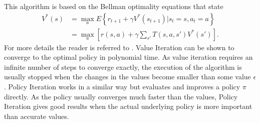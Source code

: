 \documentclass[../main.tex]{subfiles}
\begin{document}
This algorithm is based on the Bellman optimality equations that state
\begin{align}
	V^*(s) &= \max_a E\left\{r_{t+1}+\gamma V^*(s_{t+1}) | s_t = s, a_t = a\right\}\\
	&= \max_a \left[ r(s,a) + \gamma  \sum_{s'} T(s,a,s')V^*(s') \right].
\end{align}
For more details the reader is referred to \cite{sutton1998reinforcement}.
Value Iteration can be shown to converge to the optimal policy in polynomial time. As value iteration requires an infinite number of steps to converge exactly, the execution of the algorithm is usually stopped when the changes in the values become smaller than some value $\epsilon$.
Policy Iteration works in a similar way but evaluates and improves a policy $\pi$ directly. As the policy usually converges much faster than the values, Policy Iteration gives good results when the actual underlying policy is more important than accurate values.
\end{document}
